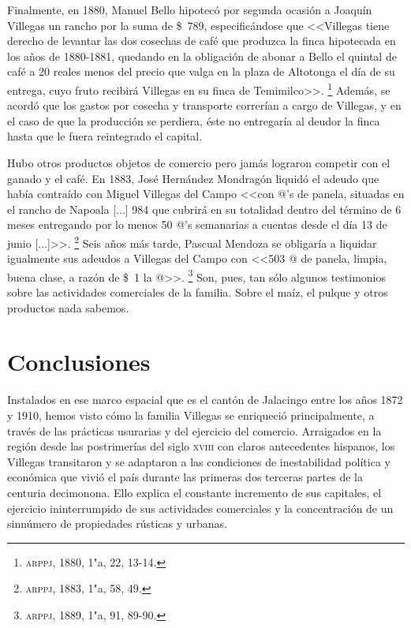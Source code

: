 \documentclass[14pt,twoside,final]{extbook} %
\let\oldfootnote\footnote
\renewcommand\footnote[1]{%
\oldfootnote{\hspace{1mm}#1}}
\begin{document}
Finalmente, en 1880, Manuel Bello hipotecó por segunda ocasión a Joaquín Villegas un rancho por la suma de \$~789, especificándose que <<Villegas tiene derecho de levantar las dos cosechas de café que produzca la finca hipotecada en los años de 1880-1881, quedando en la obligación de abonar a Bello el quintal de café a 20 reales menos del precio que valga en la plaza de Altotonga el día de su entrega, cuyo fruto recibirá Villegas en su finca de Temimilco>>.\footnote{\textsc{arppj}, 1880, 1"a, 22, 13-14.} Además, se acordó que los gastos por cosecha y transporte correrían a cargo de Villegas, y en el caso de que la producción se perdiera, éste no entregaría al deudor la finca hasta que le fuera reintegrado el capital.

Hubo otros productos objetos de comercio pero jamás lograron competir con el ganado y el café. En 1883, José Hernández Mondragón liquidó el adeudo que había contraído con Miguel Villegas del Campo <<con @'s de panela, situadas en el rancho de Napoala [...] 984 que cubrirá en su totalidad dentro del término de 6 meses entregando por lo menos 50 @'s semanarias a cuentas desde el día 13 de junio [...]>>.\footnote{\textsc{arppj}, 1883, 1"a, 58, 49.} Seis años más tarde, Pascual Mendoza se obligaría a liquidar igualmente sus adeudos a Villegas del Campo con <<503 @ de panela, limpia, buena clase, a razón de \$~1 la @>>.\footnote{\textsc{arppj}, 1889, 1"a, 91, 89-90.} Son, pues, tan sólo algunos testimonios sobre las actividades comerciales de la familia. Sobre el maíz, el pulque y otros productos nada sabemos.
\chapter*{Conclusiones}\label{ch:conclusiones}
\thispagestyle{empty}
\pagestyle{fancy}
\fancyhf{} %
\fancyhead[RO,LE]{\iffloatpage{}{\thepage}}
\renewcommand\headrulewidth{\iffloatpage{0pt}{0pt}}
\setcounter{page}{127}
Instalados en ese marco espacial que es el cantón de Jalacingo entre los años 1872 y 1910, hemos visto cómo la familia Villegas se enriqueció principalmente, a través de las prácticas usurarias y del ejercicio del comercio. Arraigados en la región desde las postrimerías del siglo \textsc{xviii} con claros antecedentes hispanos, los Villegas transitaron y se adaptaron a las condiciones de inestabilidad política y económica que vivió el país durante las primeras dos terceras partes de la
centuria decimonona. Ello explica el constante incremento de sus capitales, el ejercicio ininterrumpido de sus actividades comerciales y la concentración de un sinnúmero de propiedades rústicas y urbanas.
\end{document}

